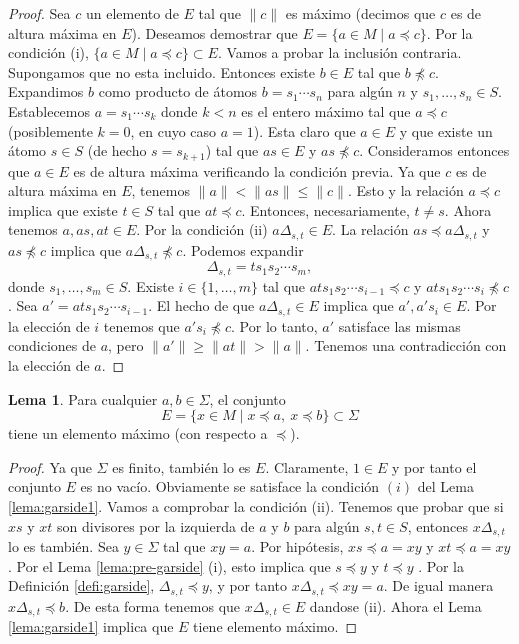 \documentclass[12pt]{book}
\theoremstyle{definition}
\newtheorem{lema}{Lema}[section]
\providecommand{\norm}[1]{\lVert#1\rVert}
\begin{document}
\begin{proof} Sea $c$ un elemento de $E$ tal que $\norm{c}$ es máximo (decimos que $c$ es de altura máxima en $E$). Deseamos demostrar que $E=\{a\in M\mid a\preceq c\}$. Por la condición (i), $\{a\in M\mid a\preceq c\}\subset E$. Vamos a probar la inclusión contraria. Supongamos que no esta incluido. Entonces existe $b\in E$ tal que $b\npreceq c$. Expandimos $b$ como producto de átomos $b=s_1\cdots s_n$ para algún $n$ y $s_1,\ldots,s_n\in S$. Establecemos $a=s_1\cdots s_k$ donde $k < n$ es el entero máximo tal que $a\preceq c$ (posiblemente $k=0$, en cuyo caso $a=1$). Esta claro que $a\in E$ y que existe un átomo $s\in S$ (de hecho $s=s_{k+1}$) tal que $as\in E$ y $as\npreceq c$. Consideramos entonces que $a\in E$ es de altura máxima verificando la condición previa. Ya que $c$ es de altura máxima en $E$, tenemos $\norm{a}<\norm{as}\leq \norm{c}$. Esto y la relación $a\preceq c$ implica que existe $t\in S$ tal que $at\preceq c$. Entonces, necesariamente, $t\neq s$. Ahora tenemos  $a,as, at\in E$. Por la condición (ii) $a\Delta_{s,t}\in E$. La relación $as\preceq a\Delta_{s,t}$ y $as\npreceq c$ implica que $a\Delta_{s,t}\npreceq c$. Podemos expandir
$$\Delta_{s,t}=ts_1s_2\cdots s_m,$$
donde $s_1,\ldots,s_m\in S$. Existe $i\in\{1,\ldots,m\}$ tal que $ats_1s_2\cdots s_{i-1}\preceq c$ y $ats_1s_2\cdots s_{i}\npreceq c$. Sea $a'=ats_1s_2\cdots s_{i-1}$. El hecho de que $a\Delta_{s,t}\in E$ implica que $a',a's_i\in E$. Por la elección de $i$ tenemos que $a's_i\npreceq c$. Por lo tanto, $a'$ satisface las mismas condiciones de $a$, pero $\norm{a'}\geq \norm{at}> \norm{a}$. Tenemos una contradicción con la elección de $a$.\end{proof}

\begin{lema}
Para cualquier $a,b\in\Sigma$, el conjunto
$$E=\{x\in M\mid x\preceq a,\ x\preceq b\}\subset \Sigma$$
tiene un elemento máximo (con respecto a $\preceq$).
\label{lema:garside2}
\end{lema}

\begin{proof} Ya que $\Sigma$ es finito, también lo es $E$. Claramente, $1\in E$ y por tanto el conjunto $E$ es no vacío. Obviamente se satisface la condición $(i)$ del Lema \ref{lema:garside1}. Vamos a comprobar la condición (ii). Tenemos que probar que si $xs$ y $xt$ son divisores por la izquierda de $a$ y $b$ para algún $s,t\in S$, entonces $x\Delta_{s,t}$ lo es también. Sea $y\in\Sigma$ tal que $xy=a$. Por hipótesis, $xs\preceq a = xy$ y $xt\preceq a = xy$. Por el Lema \ref{lema:pre-garside} (i), esto implica que $s\preceq y$ y $t\preceq y$ . Por la Definición \ref{defi:garside}, $\Delta_{s,t}\preceq y$, y por tanto $x\Delta_{s,t}\preceq xy=a$. De igual manera $x\Delta_{s,t}\preceq b$. De esta forma tenemos que $x\Delta_{s,t}\in E$ dandose (ii). Ahora el Lema \ref{lema:garside1} implica que $E$ tiene elemento máximo.
\end{proof}
\end{document}
